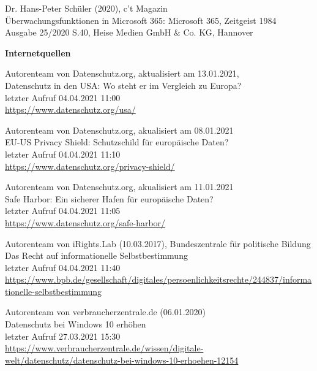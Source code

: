 \begin{thebibliography}{9}

    \bibitem{}
        Dr. Hans-Peter Schüler (2020), c't Magazin
        \\Überwachungsfunktionen in Microsoft 365: Microsoft 365, Zeitgeist 1984
        \\Ausgabe 25/2020 S.40, Heise Medien GmbH \& Co. KG, Hannover

    \vspace{.75cm}
    \textbf{\Large Internetquellen}

    \bibitem{}
        Autorenteam von Datenschutz.org, aktualisiert am 13.01.2021,
        \\Datenschutz in den USA: Wo steht er im Vergleich zu Europa?
        \\letzter Aufruf 04.04.2021 11:00
        \\\url{https://www.datenschutz.org/usa/}

    \bibitem{}
        Autorenteam von Datenschutz.org, akualisiert am 08.01.2021
        \\EU-US Privacy Shield: Schutzschild für europäische Daten?
        \\letzter Aufruf 04.04.2021 11:10
        \\\url{https://www.datenschutz.org/privacy-shield/}

    \bibitem{}
        Autorenteam von Datenschutz.org, akualisiert am 11.01.2021
        \\Safe Harbor: Ein sicherer Hafen für europäische Daten?
        \\letzter Aufruf 04.04.2021 11:05
        \\\url{https://www.datenschutz.org/safe-harbor/}

    \bibitem{}
        Autorenteam von iRights.Lab (10.03.2017), Bundeszentrale für politische Bildung
        \\Das Recht auf informationelle Selbstbestimmung
        \\letzter Aufruf 04.04.2021 11:40
        \\\url{https://www.bpb.de/gesellschaft/digitales/persoenlichkeitsrechte/244837/informationelle-selbstbestimmung}

    \bibitem{}
        Autorenteam von verbraucherzentrale.de (06.01.2020)
        \\Datenschutz bei Windows 10 erhöhen
        \\letzter Aufruf 27.03.2021 15:30
        \\\url{https://www.verbraucherzentrale.de/wissen/digitale-welt/datenschutz/datenschutz-bei-windows-10-erhoehen-12154}


\end{thebibliography}
